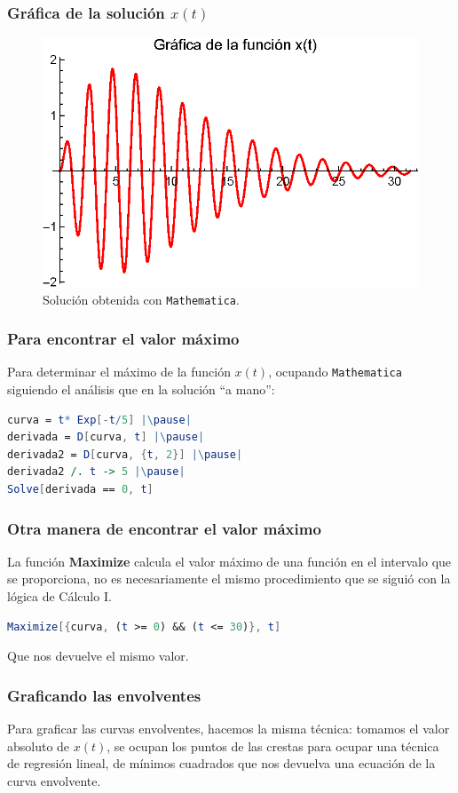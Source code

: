 \begin{frame}
\frametitle{Gráfica de la solución $x(t)$}
\begin{figure}[H]
    \centering
    \includegraphics[scale=1]{Imagenes/Ejemplo_Resonancia_01.eps}
    \caption{Solución obtenida con \texttt{Mathematica}.}
\end{figure}
\end{frame}
\begin{frame}[fragile]
\frametitle{Para encontrar el valor máximo}
Para determinar el máximo de la función $x(t)$, ocupando \texttt{Mathematica} siguiendo el análisis que en la solución \enquote{a mano}: \pause
\begin{lstlisting}[language=Mathematica]
curva = t* Exp[-t/5] |\pause|
derivada = D[curva, t] |\pause|
derivada2 = D[curva, {t, 2}] |\pause|
derivada2 /. t -> 5 |\pause|
Solve[derivada == 0, t]
\end{lstlisting}
\end{frame}
\begin{frame}[fragile]
\frametitle{Otra manera de encontrar el valor máximo}
La función \textbf{Maximize} calcula el valor máximo de una función en el intervalo que se proporciona, no es necesariamente el mismo procedimiento que se siguió con la lógica de Cálculo I. \pause
\begin{lstlisting}[language=Mathematica]
Maximize[{curva, (t >= 0) && (t <= 30)}, t]
\end{lstlisting}
Que nos devuelve el mismo valor.
\end{frame}
\begin{frame}
\frametitle{Graficando las envolventes}
Para graficar las curvas envolventes, hacemos la misma técnica: tomamos el valor absoluto de $x(t)$, se ocupan los puntos de las crestas para ocupar una técnica de regresión lineal, de mínimos cuadrados que nos devuelva una ecuación de la curva envolvente.
\end{frame}
